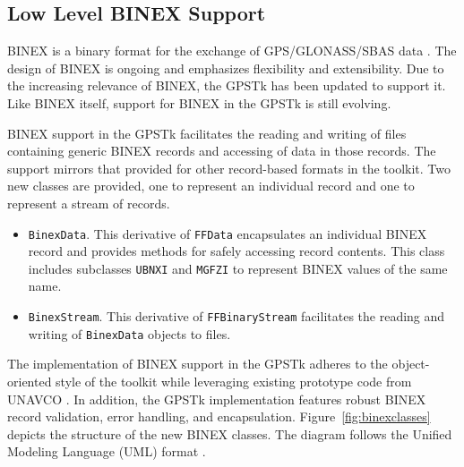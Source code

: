 \documentclass{ion-gps}
\newcommand{\gpstkclass}[1]{\texttt{#1}}
\begin{document}
\subsection*{Low Level BINEX Support}

BINEX is a binary format for the exchange of GPS/GLONASS/SBAS
data \cite{binexformat}. The design of BINEX is ongoing and emphasizes
flexibility and extensibility. Due to the increasing relevance of
BINEX, the GPSTk has been updated to support it. Like BINEX
itself, support for BINEX in the GPSTk is still evolving.

BINEX support in the GPSTk facilitates the reading and writing of
files containing generic BINEX records and accessing of data in
those records.  The support mirrors that provided for other
record-based formats in the toolkit.  Two new classes are provided,
one to represent an individual record and one to represent a stream of
records.

\begin{itemize}
   \item{ \gpstkclass{BinexData}. This derivative of \gpstkclass{FFData} 
          encapsulates an individual BINEX record and provides methods for 
          safely accessing record contents. This class includes subclasses 
          \gpstkclass{UBNXI} and \gpstkclass{MGFZI} to represent 
           BINEX values of the same name.}
   \item{ \gpstkclass{BinexStream}. This derivative of 
          \gpstkclass{FFBinaryStream} facilitates the reading and writing 
           of \gpstkclass{BinexData} objects to files. }
\end{itemize}

The implementation of BINEX support in the GPSTk adheres to the
object-oriented style of the toolkit while leveraging existing
prototype code from UNAVCO \cite{binexformat}.  In addition, the GPSTk implementation
features robust BINEX record validation, error handling, and
encapsulation.  Figure~\ref{fig:binexclasses} depicts the structure of
the new BINEX classes. The diagram follows the Unified Modeling
Language (UML) format \cite{umlstandard}.
\end{document}
